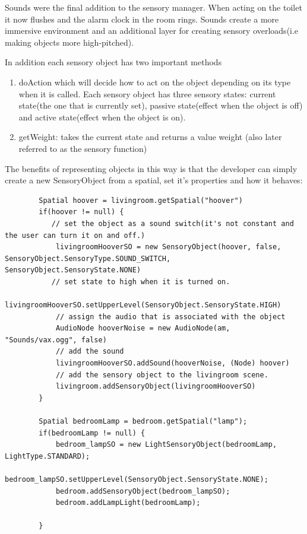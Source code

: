 \documentclass[11pt]{report}
\begin{document}
Sounds were the final addition to the sensory manager. When acting on the toilet it now flushes and the alarm clock in the room rings. Sounds create a more immersive environment and an additional layer for creating sensory overloads(i.e making objects more high-pitched). 

In addition each sensory object has two important methods
\begin{enumerate}
\item  doAction which will decide how to act on the object depending on its type when it is called. Each sensory object has three sensory states: current state(the one that is currently set), passive state(effect when the object is off) and active state(effect when the object is on). 
\item getWeight: takes the current state and returns a value weight (also later referred to as the sensory function)
\end{enumerate}

The benefits of representing objects in this way is that the developer can simply create a new SensoryObject from a spatial, set it's properties and how it behaves:

\begin{lstlisting}
        Spatial hoover = livingroom.getSpatial("hoover")
        if(hoover != null) {
           // set the object as a sound switch(it's not constant and the user can turn it on and off.)
            livingroomHooverSO = new SensoryObject(hoover, false, SensoryObject.SensoryType.SOUND_SWITCH, SensoryObject.SensoryState.NONE)
           // set state to high when it is turned on.
            livingroomHooverSO.setUpperLevel(SensoryObject.SensoryState.HIGH)
            // assign the audio that is associated with the object
            AudioNode hooverNoise = new AudioNode(am, "Sounds/vax.ogg", false)
            // add the sound
            livingroomHooverSO.addSound(hooverNoise, (Node) hoover)
            // add the sensory object to the livingroom scene. 
            livingroom.addSensoryObject(livingroomHooverSO)
        } 
        
        Spatial bedroomLamp = bedroom.getSpatial("lamp");
        if(bedroomLamp != null) {     
            bedroom_lampSO = new LightSensoryObject(bedroomLamp, LightType.STANDARD);
            bedroom_lampSO.setUpperLevel(SensoryObject.SensoryState.NONE);
            bedroom.addSensoryObject(bedroom_lampSO);
            bedroom.addLampLight(bedroomLamp);
            
        }    
\end{lstlisting}
\end{document}
